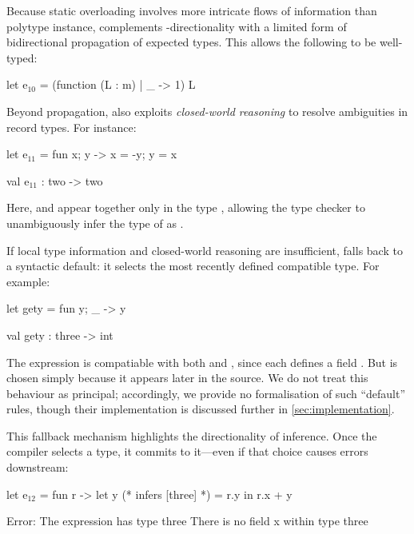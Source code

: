 \documentclass[acmsmall,screen,nonacm]{acmart}
\begin{document}

Because static overloading involves more intricate flows of information than
polytype instance, \OCaml complements \geninst-directionality with a
limited form of bidirectional propagation of expected types. This allows the
following to be well-typed:
\begin{program}[input]
  let e$_{10}$ = (function (L : m) | _ -> 1) L
\end{program}


Beyond propagation, \OCaml also exploits \emph{closed-world reasoning} to resolve
ambiguities in record types. For instance:
\begin{program}[input]
  let e$_{11}$ = fun {x; y} -> {x = -y; y = x}
\end{program}
\programjoin
\begin{program}[output]
  val e$_{11}$ : two -> two
\end{program}
Here,  and  appear together only in the type ,
allowing the type checker to unambiguously infer the type of  as
.


If local type information and closed-world reasoning are insufficient,
\OCaml falls back to a syntactic default: it selects the most recently
defined compatible type. For example:
\begin{program}[input]
  let gety = fun {y; _} -> y
\end{program}
\programjoin
\begin{program}[output]
  val gety : three -> int
\end{program}
The expression is compatiable with both  and ,
since each defines a field . But  is chosen simply
because it appears later in the source.
We do not treat this behaviour as principal; accordingly, we provide
no formalisation of such ``default'' rules, though their implementation is
discussed further in \cref{sec:implementation}.

This fallback mechanism highlights the directionality of \OCaml inference.
Once the compiler selects a type, it commits to it---even if that choice
causes errors downstream:
\begin{program}[error]
  let e$_{12}$ = fun r -> let y (* infers [three] *) = r.y in r.x + y
\end{program}
\programjoin
\begin{program}[error, style=message]
  Error: The expression has type three
	 There is no field x within type three
\end{program}
\end{document}
